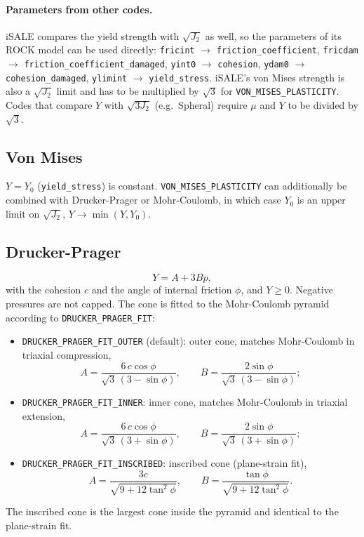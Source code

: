 \documentclass[10pt,fleqn,twoside]{article}
\newcommand{\code}[1]{\texttt{#1}}
\newcommand{\sw}[1]{\texttt{#1}}
\begin{document}
\paragraph{Parameters from other codes.} iSALE \citep{collins2004} compares the yield strength with $\sqrt{J_2}$ as
well, so the parameters of its ROCK model can be used directly: \code{fricint} $\rightarrow$
\code{friction\_coefficient}, \code{fricdam} $\rightarrow$ \code{friction\_coefficient\_damaged}, \code{yint0}
$\rightarrow$ \code{cohesion}, \code{ydam0} $\rightarrow$ \code{cohesion\_damaged}, \code{ylimint} $\rightarrow$
\code{yield\_stress}. iSALE's von Mises strength is also a $\sqrt{J_2}$ limit and has to be multiplied by $\sqrt{3}$
for \sw{VON\_MISES\_PLASTICITY}. Codes that compare $Y$ with $\sqrt{3J_2}$ (e.g.\ Spheral) require $\mu$ and $Y$ to
be divided by $\sqrt{3}$.

\subsection{Von Mises}
$Y = Y_0$ (\code{yield\_stress}) is constant. \sw{VON\_MISES\_PLASTICITY} can additionally be combined with
Drucker-Prager or Mohr-Coulomb, in which case $Y_0$ is an upper limit on $\sqrt{J_2}$, $Y \rightarrow \min(Y, Y_0)$.

\subsection{Drucker-Prager}
\label{sec:drucker_prager}
\begin{equation}
 Y = A + 3Bp,
\end{equation}
with the cohesion $c$ and the angle of internal friction $\phi$, and $Y \geq 0$. Negative pressures are not capped.
The cone is fitted to the Mohr-Coulomb pyramid according to \sw{DRUCKER\_PRAGER\_FIT}:
\begin{itemize}
 \item \sw{DRUCKER\_PRAGER\_FIT\_OUTER} (default): outer cone, matches Mohr-Coulomb in triaxial compression,
 \begin{equation}
  A = \frac{6\,c\cos\phi}{\sqrt{3}\,(3-\sin\phi)}, \qquad B = \frac{2\sin\phi}{\sqrt{3}\,(3-\sin\phi)};
 \end{equation}
 \item \sw{DRUCKER\_PRAGER\_FIT\_INNER}: inner cone, matches Mohr-Coulomb in triaxial extension,
 \begin{equation}
  A = \frac{6\,c\cos\phi}{\sqrt{3}\,(3+\sin\phi)}, \qquad B = \frac{2\sin\phi}{\sqrt{3}\,(3+\sin\phi)};
 \end{equation}
 \item \sw{DRUCKER\_PRAGER\_FIT\_INSCRIBED}: inscribed cone (plane-strain fit),
 \begin{equation}
  A = \frac{3c}{\sqrt{9+12\tan^2\phi}}, \qquad B = \frac{\tan\phi}{\sqrt{9+12\tan^2\phi}}.
 \end{equation}
\end{itemize}
The inscribed cone is the largest cone inside the pyramid and identical to the plane-strain fit.
\end{document}
